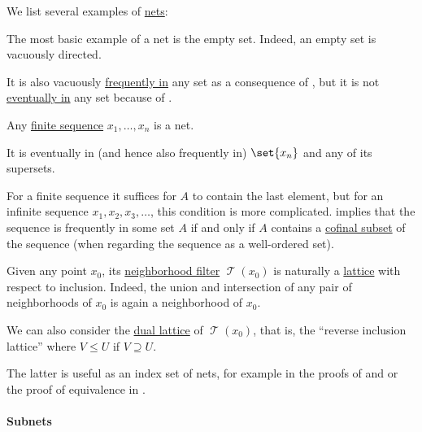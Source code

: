 \begin{example}\label{ex:def:topological_net}
  We list several examples of \hyperref[def:topological_net]{nets}:
  \begin{thmenum}
     The most basic example of a net is the empty set. Indeed, an empty set is vacuously directed.

    It is also vacuously \hyperref[def:net_frequently_in]{frequently in} any set as a consequence of , but it is not \hyperref[def:net_eventually_in]{eventually in} any set because of .

     Any \hyperref[def:sequence]{finite sequence} \( x_1, \ldots, x_n \) is a net.

    It is eventually in (and hence also frequently in) \( \set{ x_n } \) and any of its supersets.

     For a finite sequence it suffices for \( A \) to contain the last element, but for an infinite sequence \( x_1, x_2, x_3, \ldots \), this condition is more complicated.  implies that the sequence is frequently in some set \( A \) if and only if \( A \) contains a \hyperref[def:cofinal_set]{cofinal subset} of the sequence (when regarding the sequence as a well-ordered set).

     Given any point \( x_0 \), its \hyperref[def:neighborhood_filter]{neighborhood filter} \( \mscrT(x_0) \) is naturally a \hyperref[def:lattice]{lattice} with respect to inclusion. Indeed, the union and intersection of any pair of neighborhoods of \( x_0 \) is again a neighborhood of \( x_0 \).

    We can also consider the \hyperref[thm:lattice_duality]{dual lattice} of \( \mscrT(x_0) \), that is, the \enquote{reverse inclusion lattice} where \( V \leq U \) if \( V \supseteq U \).

    The latter is useful as an index set of nets, for example in the proofs of  and  or the proof of equivalence in .
  \end{thmenum}
\end{example}

\paragraph{Subnets}

